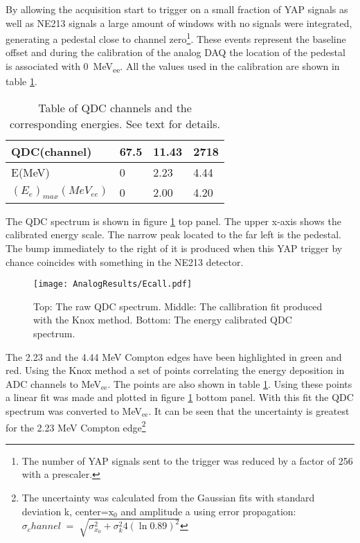 \documentclass[main.tex]{subfiles}
\begin{document}
By allowing the acquisition start to trigger on a small fraction of YAP signals as well as NE213 signals a large amount of windows with no signals were integrated, generating a pedestal close to channel zero\footnote{The number of YAP signals sent to the trigger was reduced by a factor of 256 with a prescaler.}. These events represent the baseline offset and during the calibration of the analog DAQ the location of the pedestal is associated with \SI{0}{MeV_{ee}}. All the values used in the calibration are shown in table \ref{tab:knox_a}.

\begin{table}[hb]
	\center
	\begin{tabular}{|l|l|l|l|}
	\hline
	QDC(channel)             & 67.5 & 11.43 & 2718 \\
	\hline
	E(MeV)          & 0    & 2.23  & 4.44 \\
	\hline
	$(E_{e})_{max}(MeV_{ee})$ & 0    & 2.00  & 4.20 \\
	\hline
	\end{tabular}
   	\captionsetup{width=0.435\linewidth}
	\caption[Table of values used for energy calibration, analog setup.]{Table of QDC channels and the corresponding energies. See text for details.}
	\label{tab:knox_a}
\end{table}

The QDC spectrum is shown in figure \ref{fig:qdc_a} top panel. The upper x-axis shows the calibrated energy scale. The narrow peak located to the far left is the pedestal. The bump immediately to the right of it is produced when this YAP trigger by chance coincides with something in the NE213 detector.
\begin{figure}[ht!]
    \centering
        \texttt{[image: AnalogResults/Ecall.pdf]}
        \caption[Energy calibration of the analog setup]{Top: The raw QDC spectrum. Middle: The callibration fit produced with the Knox method. Bottom: The energy calibrated QDC spectrum.}
    \label{fig:qdc_a}
\end{figure}

The 2.23 and the 4.44 MeV Compton edges have been highlighted in green and red. Using the Knox method a set of points correlating the energy deposition in ADC channels to \si{\MeV}$_\text{ee}$. The points are also shown in table \ref{tab:knox_a}. Using these points a linear fit was made and plotted in figure \ref{fig:qdc_a} bottom panel. With this fit the QDC spectrum was converted to \si{\MeV}$_\text{ee}$. It can be seen that the uncertainty is greatest for the 2.23 \si{\MeV} Compton edge\footnote{The uncertainty was calculated from the Gaussian fits with standard deviation k, center=$\text{x}_\text{0}$ and amplitude a using error propagation: $\sigma_channel\;=\;\sqrt{\sigma_{x_0}^2 + \sigma_{k}^2 4\left(\ln0.89\right)^2 }$}
\end{document}
